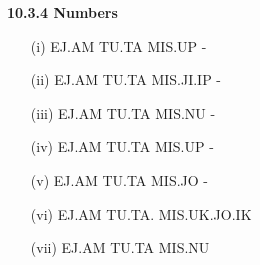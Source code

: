 \noindent \textbf{10.3.4 Numbers} 
\begin{itemize}
    \item[(i)]EJ.AM TU.TA MIS.UP - \ej\am \tu\ta \mis\up 

    \item[(ii)]EJ.AM TU.TA MIS.JI.IP - \ej\am \tu\ta \mis\ji\ip 

    \item[(iii)]EJ.AM TU.TA MIS.NU - \ej\am \tu\ta \mis\nu 

\item[(iv)] EJ.AM TU.TA MIS.UP  - \ej\am \tu\ta \mis\up 

    \item[(v)] EJ.AM TU.TA MIS.JO - \ej\am \tu\ta \mis\jo 

    \item[(vi)] EJ.AM TU.TA. MIS.UK.JO.IK 

\item[]\ej\am \tu\ta \mis\uk\jo\ik 

    \item[(vii)] EJ.AM TU.TA MIS.NU \ej\am \tu\ta \mis\nu
\end{itemize}
